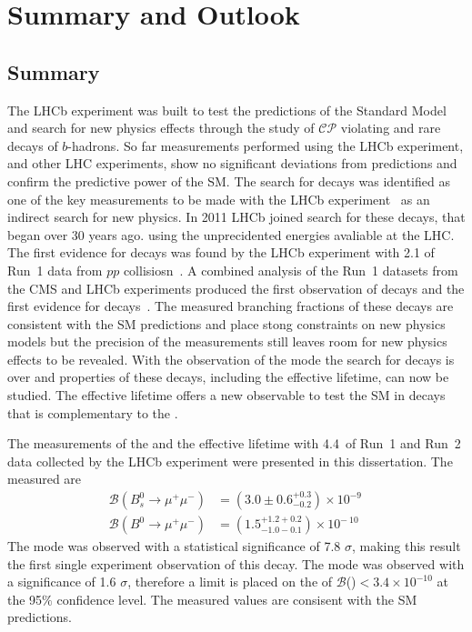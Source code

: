 \chapter{Summary and Outlook}
\label{sec:summaryandoutlook}

\section{Summary}
The LHCb experiment was built to test the predictions of the Standard Model and search for new physics effects through the study of $\mathcal{CP}$ violating and rare decays of $b$-hadrons. So far measurements performed using the LHCb experiment, and other LHC experiments, show no significant deviations from predictions and confirm the predictive power of the SM. 
The search for \bmumu decays was identified as one of the key measurements to be made with the LHCb experiment~\cite{Adeva:2009ny} as an indirect search for new physics.
In 2011 LHCb joined search for these decays, that began over 30 years ago. using the unprecidented energies avaliable at the LHC. The first evidence for \bsmumu decays was found by the LHCb experiment with 2.1 \fb of Run~1 data from $pp$ collisiosn~\cite{Aaij:2012nna,}. A combined analysis of the Run~1 datasets from the CMS and LHCb experiments produced the first observation of \bsmumu decays and the first evidence for \bdmumu decays~\cite{CMS:2014xfa}. The measured branching fractions of these decays are consistent with the SM predictions and place stong constraints on new physics models but the precision of the measurements still leaves room for new physics effects to be revealed. With the observation of the \bs mode the search for \bsmumu decays is over and properties of these decays, including the effective lifetime, can now be studied. The effective lifetime offers a new observable to test the SM in \bsmumu decays that is complementary to the \BF. 

The measurements of the \bmumu \BF and the \bsmumu effective lifetime with 4.4~\fb of Run~1 and Run~2 data collected by the LHCb experiment were presented in this dissertation. The measured \BFs are
\begin{equation}
\begin{split}
  \mathcal{B}(B^{0}_{s} \to \mu^{+} \mu^{-}) &= (3.0 \pm 0.6^{+0.3}_{-0.2}) \times 10^{-9\
} \\
  \mathcal{B}(B^{0} \to \mu^{+} \mu^{-}) &= (1.5^{+1.2 +0.2}_{-1.0 -0.1})    \times 10^{-\
10}
\end{split}
\label{eq:BFresults2}
\end{equation}
The \bs mode was observed with a statistical significance of 7.8 $\sigma$, making this result the first single experiment observation of this decay. The \bd mode was observed with a significance of 1.6 $\sigma$, therefore a limit is placed on the \BF of $\mathcal{B}$(\bdmumu)$ < 3.4 \times 10^{-10}$ at the 95$\%$ confidence level. The measured values are consisent with the SM predictions. %


